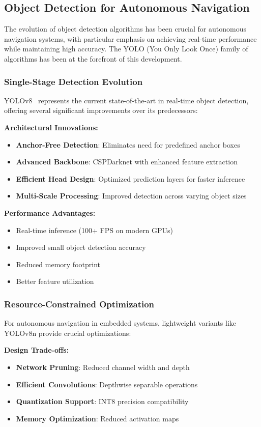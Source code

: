 \documentclass[12pt,oneside]{book}
\begin{document}
\subsection{Object Detection for Autonomous Navigation}

The evolution of object detection algorithms has been crucial for autonomous navigation systems, with particular emphasis on achieving real-time performance while maintaining high accuracy. The YOLO (You Only Look Once) family of algorithms has been at the forefront of this development.

\subsubsection{Single-Stage Detection Evolution}
YOLOv8~\cite{jocher2023ultralytics} represents the current state-of-the-art in real-time object detection, offering several significant improvements over its predecessors:

\textbf{Architectural Innovations:}
\begin{itemize}
    \item \textbf{Anchor-Free Detection}: Eliminates need for predefined anchor boxes
    \item \textbf{Advanced Backbone}: CSPDarknet with enhanced feature extraction
    \item \textbf{Efficient Head Design}: Optimized prediction layers for faster inference
    \item \textbf{Multi-Scale Processing}: Improved detection across varying object sizes
\end{itemize}

\textbf{Performance Advantages:}
\begin{itemize}
    \item Real-time inference (100+ FPS on modern GPUs)
    \item Improved small object detection accuracy
    \item Reduced memory footprint
    \item Better feature utilization
\end{itemize}

\subsubsection{Resource-Constrained Optimization}
For autonomous navigation in embedded systems, lightweight variants like YOLOv8n provide crucial optimizations:

\textbf{Design Trade-offs:}
\begin{itemize}
    \item \textbf{Network Pruning}: Reduced channel width and depth
    \item \textbf{Efficient Convolutions}: Depthwise separable operations
    \item \textbf{Quantization Support}: INT8 precision compatibility
    \item \textbf{Memory Optimization}: Reduced activation maps
\end{itemize}
\end{document}
